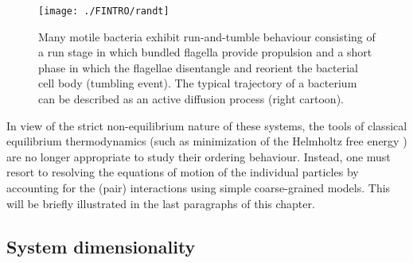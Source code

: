 \documentclass[amssymb]{revtex4}
\begin{document}
\begin{figure}
\begin{center}
\texttt{[image: ./FINTRO/randt]}
\caption{ \label{introfig6} Many motile bacteria exhibit run-and-tumble behaviour consisting of a run stage in which bundled flagella provide propulsion and a short phase in which the flagellae disentangle and reorient the bacterial cell body (tumbling event). The typical trajectory of a bacterium can be described as an active diffusion process (right cartoon).}
\end{center}
\end{figure}


In view of the strict non-equilibrium nature of these systems,  the tools of classical equilibrium thermodynamics (such as minimization of the Helmholtz free energy ) are no longer appropriate to study their ordering behaviour. Instead,  one must resort to resolving the equations of motion of the individual particles by accounting for the (pair) interactions using simple coarse-grained models. This will be briefly illustrated in the last paragraphs of this chapter.
  
  
  \subsection{System dimensionality}   
 
\end{document}
